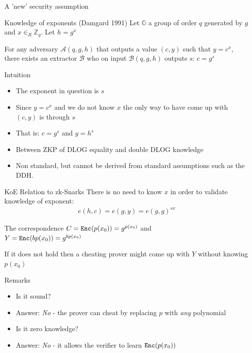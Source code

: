 \documentclass[handout]{beamer}
\begin{document}
\begin{frame}{A 'new' security assumption}
    \begin{block}{Knowledge of exponents (Damgard 1991)}
    Let $\mathbb{G}$ a group of order $q$ generated by $g$ and $x \in_R \mathbb{Z}_q$. Let $h = g^x$
    
    For any adversary $\mathcal{A}(q,g,h)$ that outputs a value $(c,y)$ such that $y=c^x$,
    there exists an extractor $\mathcal{B}$ who on input $\mathcal{B}(q,g,h)$ 
    outputs $s$: $c=g^s$
    \end{block}
    \pause
    \begin{block}{Intuition}
        \begin{itemize}
            \item The exponent in question is $s$
            \item Since $y=c^x$ and we do not know $x$ the only way to have come up with $(c,y)$ is 
                  through $s$
            \item That is: $c=g^s$ and $y=h^s$
            \item Between ZKP of DLOG equality and double DLOG knowledge
            \item Non standard, but cannot be derived from standard assumptions such as the DDH.
        \end{itemize}
    \end{block}   
\end{frame}

\begin{frame}{KoE Relation to zk-Snarks}
There is no need to know $x$ in order to validate knowledge of exponent:
\begin{align*}
e(h,c) = e(g,y) = e(g,g)^{sx}
\end{align*}

\begin{block}{The correspondence}
$C=\mathtt{Enc}(p(x_0))=g^{p(x_0)}$ and \\
$Y=\mathtt{Enc}(bp(x_0))=g^{bp(x_0)}$
\end{block}
If it does not hold then a cheating prover might come up with $Y$ without knowing $p(x_0)$
\end{frame}

\begin{frame}{Remarks}
    \begin{itemize}
        \item Is it sound?
        \pause
        \item Answer: \emph{No} - the prover can cheat by replacing $p$ with \emph{any} polynomial
        \pause
        \item Is it zero knowledge?
        \pause
        \item Answer: \emph{No} - it allows the verifier to learn $\mathtt{Enc}(p(x_0))$
    \end{itemize}
\end{frame}
\end{document}
